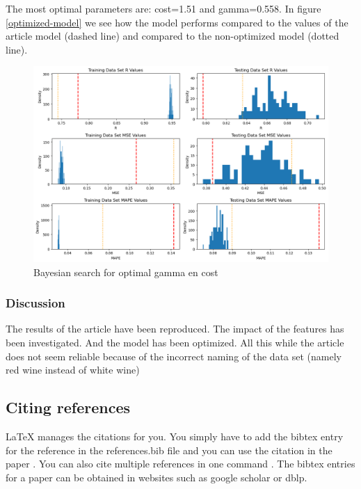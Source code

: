 \documentclass{article}
\begin{document}
The most optimal parameters are: cost=1.51 and gamma=0.558.
In figure \ref{optimized-model} we see how the model performs compared to the values of the article model (dashed line) and compared to the non-optimized model (dotted line).
\begin{figure}
	\centering
	\includegraphics[width=\linewidth]{figures/SVR_optimized_model.png}
	\caption{Bayesian search for optimal gamma en cost}
	\label{fig:one-col-figure}
\end{figure}


\subsubsection{Discussion}


The results of the article have been reproduced. The impact of the features has been investigated. And the model has been optimized. All this while the article does not seem reliable because of the incorrect naming of the data set (namely red wine instead of white wine)


\subsection{Citing references}
LaTeX manages the citations for you. You simply have to add the bibtex entry for the reference in the references.bib file and you can use the citation in the paper \cite{langley00}. You can also cite multiple references in one command \cite{DudaHart2nd,Newell81,kearns89}. The bibtex entries for a paper can be obtained in websites such as google scholar or dblp.
\end{document}
